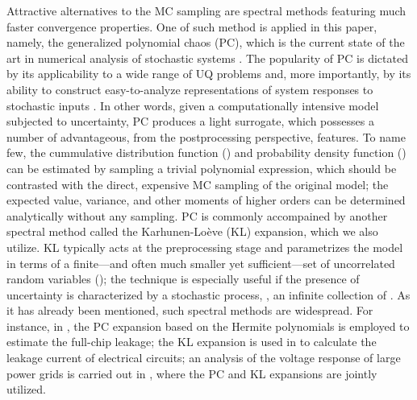 Attractive alternatives to the MC sampling are spectral methods \cite{xiu2010, maitre2010, ghanem1991} featuring much faster convergence properties. One of such method is applied in this paper, namely, the generalized polynomial chaos (PC), which is the current state of the art in numerical analysis of stochastic systems \cite{xiu2010}. The popularity of PC is dictated by its applicability to a wide range of UQ problems and, more importantly, by its ability to construct easy-to-analyze representations of system responses to stochastic inputs \cite{eldred2009}. In other words, given a computationally intensive model subjected to uncertainty, PC produces a light surrogate, which possesses a number of advantageous, from the postprocessing perspective, features. To name few, the cummulative distribution function (\cdf) and probability density function (\pdf) \cite{durrett2010} can be estimated by sampling a trivial polynomial expression, which should be contrasted with the direct, expensive MC sampling of the original model; the expected value, variance, and other moments of higher orders can be determined analytically without any sampling. PC is commonly accompained by another spectral method called the Karhunen-Lo\`{e}ve (KL) expansion, which we also utilize. KL typically acts at the preprocessing stage and parametrizes the model in terms of a finite---and often much smaller yet sufficient---set of uncorrelated random variables (\rvs); the technique is especially useful if the presence of uncertainty is characterized by a stochastic process, \ie, an infinite collection of \rvs. As it has already been mentioned, such spectral methods are widespread. For instance, in \cite{shen2009}, the PC expansion based on the Hermite polynomials is employed to estimate the full-chip leakage; the KL expansion is used in \cite{bhardwaj2006} to calculate the leakage current of electrical circuits; an analysis of the voltage response of large power grids is carried out in \cite{ghanta2006}, where the PC and KL expansions are jointly utilized.

